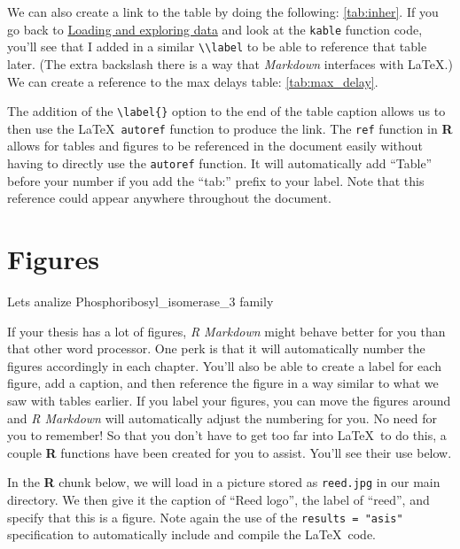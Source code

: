 \documentclass[12pt,twoside]{reedthesis}
\begin{document}
  We can also create a link to the table by doing the following:
  \autoref{tab:inher}. If you go back to
  \protect\hyperlink{loading-and-exploring-data}{Loading and exploring
  data} and look at the \texttt{kable} function code, you'll see that I
  added in a similar \texttt{\textbackslash{}\textbackslash{}label} to be
  able to reference that table later. (The extra backslash there is a way
  that \emph{Markdown} interfaces with \LaTeX.) We can create a reference
  to the max delays table: \autoref{tab:max_delay}.
  
  The addition of the \texttt{\textbackslash{}label\{\}} option to the end
  of the table caption allows us to then use the \LaTeX~\texttt{autoref}
  function to produce the link. The \texttt{ref} function in \textbf{R}
  allows for tables and figures to be referenced in the document easily
  without having to directly use the \texttt{autoref} function. It will
  automatically add ``Table'' before your number if you add the ``tab:''
  prefix to your label. Note that this reference could appear anywhere
  throughout the document.
  
  \clearpage
  
  \section{Figures}\label{figures-1}
  
  Lets analize Phosphoribosyl\_isomerase\_3 family
  
  If your thesis has a lot of figures, \emph{R Markdown} might behave
  better for you than that other word processor. One perk is that it will
  automatically number the figures accordingly in each chapter. You'll
  also be able to create a label for each figure, add a caption, and then
  reference the figure in a way similar to what we saw with tables
  earlier. If you label your figures, you can move the figures around and
  \emph{R Markdown} will automatically adjust the numbering for you. No
  need for you to remember! So that you don't have to get too far into
  \LaTeX~to do this, a couple \textbf{R} functions have been created for
  you to assist. You'll see their use below.
  
  In the \textbf{R} chunk below, we will load in a picture stored as
  \texttt{reed.jpg} in our main directory. We then give it the caption of
  ``Reed logo'', the label of ``reed'', and specify that this is a figure.
  Note again the use of the \texttt{results\ =\ "asis"} specification to
  automatically include and compile the \LaTeX~code.
  
\end{document}
